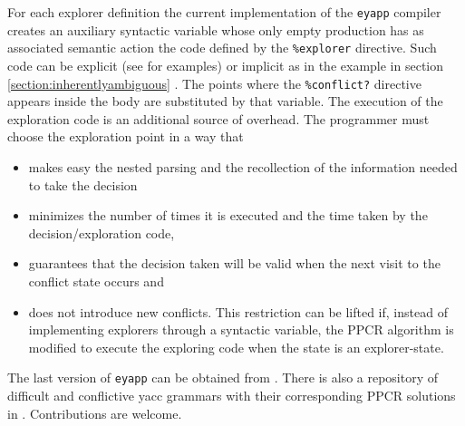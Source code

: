 For each explorer definition the current implementation of the \verb|eyapp| compiler 
creates an auxiliary syntactic variable  
whose only empty production has as associated semantic action
the code defined by the \verb|%explorer| directive. Such code can be explicit 
(see \cite{lgforte} for examples)
or implicit as in the example in section
\ref{section:inherentlyambiguous} 
. The points where the 
\verb|%conflict?| directive appears inside the body
are substituted by that variable. 
The execution of the exploration code is an additional source of overhead.
The programmer must choose the exploration point in a way that 
\begin{itemize}
\item
makes easy the nested parsing and the recollection of the information needed to take the decision
\item
minimizes the number of times it is executed and
the time taken by the decision/exploration code,
\item
guarantees that the decision taken will be valid when the next visit to the conflict state
occurs 
and
\item
does not introduce new conflicts. 
This restriction can be lifted if, instead of implementing explorers 
through a syntactic variable, the PPCR algorithm is modified to
execute the exploring code when the state is an explorer-state.
\end{itemize}

The last version of \verb|eyapp| can be obtained from  \cite{Rodriguez:Leon}.
There is also a repository of difficult and conflictive yacc grammars with their corresponding
PPCR solutions in \cite{lgforte}. Contributions are welcome.

